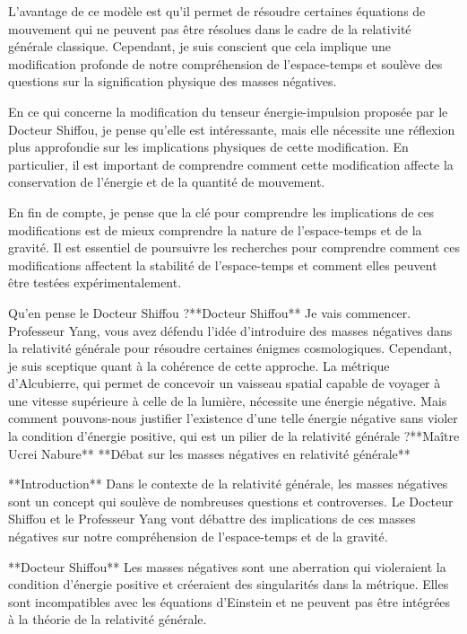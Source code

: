 L'avantage de ce modèle est qu'il permet de résoudre certaines équations de mouvement qui ne peuvent pas être résolues dans le cadre de la relativité générale classique. Cependant, je suis conscient que cela implique une modification profonde de notre compréhension de l'espace-temps et soulève des questions sur la signification physique des masses négatives.

En ce qui concerne la modification du tenseur énergie-impulsion proposée par le Docteur Shiffou, je pense qu'elle est intéressante, mais elle nécessite une réflexion plus approfondie sur les implications physiques de cette modification. En particulier, il est important de comprendre comment cette modification affecte la conservation de l'énergie et de la quantité de mouvement.

En fin de compte, je pense que la clé pour comprendre les implications de ces modifications est de mieux comprendre la nature de l'espace-temps et de la gravité. Il est essentiel de poursuivre les recherches pour comprendre comment ces modifications affectent la stabilité de l'espace-temps et comment elles peuvent être testées expérimentalement.

Qu'en pense le Docteur Shiffou ?**Docteur Shiffou**
Je vais commencer. Professeur Yang, vous avez défendu l'idée d'introduire des masses négatives dans la relativité générale pour résoudre certaines énigmes cosmologiques. Cependant, je suis sceptique quant à la cohérence de cette approche. La métrique d'Alcubierre, qui permet de concevoir un vaisseau spatial capable de voyager à une vitesse supérieure à celle de la lumière, nécessite une énergie négative. Mais comment pouvons-nous justifier l'existence d'une telle énergie négative sans violer la condition d'énergie positive, qui est un pilier de la relativité générale ?**Maître Ucrei Nabure**
**Débat sur les masses négatives en relativité générale**

**Introduction**
Dans le contexte de la relativité générale, les masses négatives sont un concept qui soulève de nombreuses questions et controverses. Le Docteur Shiffou et le Professeur Yang vont débattre des implications de ces masses négatives sur notre compréhension de l'espace-temps et de la gravité.

**Docteur Shiffou**
Les masses négatives sont une aberration qui violeraient la condition d'énergie positive et créeraient des singularités dans la métrique. Elles sont incompatibles avec les équations d'Einstein et ne peuvent pas être intégrées à la théorie de la relativité générale.

